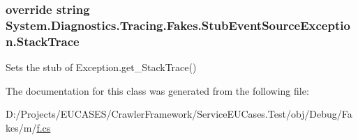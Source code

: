 \hypertarget{class_system_1_1_diagnostics_1_1_tracing_1_1_fakes_1_1_stub_event_source_exception_a537b85bb2da27a4352bf813a42a8e83e}{
\subsubsection[{Stack\-Trace}]{\setlength{\rightskip}{0pt plus 5cm}override string System.\-Diagnostics.\-Tracing.\-Fakes.\-Stub\-Event\-Source\-Exception.\-Stack\-Trace\hspace{0.3cm}{\ttfamily [get]}}}\label{class_system_1_1_diagnostics_1_1_tracing_1_1_fakes_1_1_stub_event_source_exception_a537b85bb2da27a4352bf813a42a8e83e}


Sets the stub of Exception.\-get\-\_\-\-Stack\-Trace()



The documentation for this class was generated from the following file\-:\begin{DoxyCompactItemize}
\item 
D\-:/\-Projects/\-E\-U\-C\-A\-S\-E\-S/\-Crawler\-Framework/\-Service\-E\-U\-Cases.\-Test/obj/\-Debug/\-Fakes/m/\hyperlink{m_2f_8cs}{f.\-cs}\end{DoxyCompactItemize}
